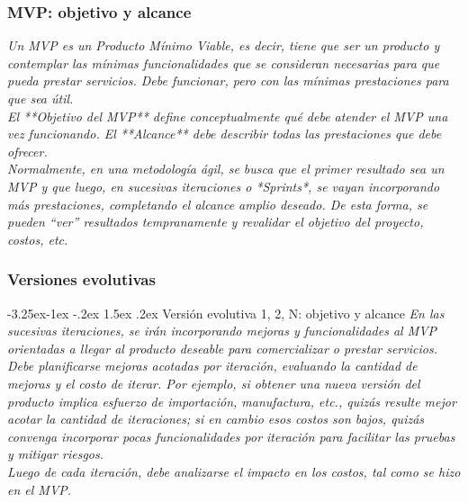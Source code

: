 \documentclass[12pt]{article}
\makeatletter
\renewcommand\paragraph{\@startsection{paragraph}{4}{\z@}%
                                     {-3.25ex\@plus -1ex \@minus -.2ex}%
                                     {1.5ex \@plus .2ex}%
                                     {\normalfont\normalsize\bfseries}}
\makeatother
\begin{document}
\subsubsection{MVP: objetivo y alcance}
{\it
Un MVP es un Producto Mínimo Viable, es decir, tiene que ser un producto y contemplar las mínimas funcionalidades que se consideran necesarias para que pueda prestar servicios. Debe funcionar, pero con las mínimas prestaciones para que sea útil.\\
El **Objetivo del MVP** define conceptualmente qué debe atender el MVP una vez funcionando. El **Alcance** debe describir todas las prestaciones que debe ofrecer.\\
Normalmente, en una metodología ágil, se busca que el primer resultado sea un MVP y que luego, en sucesivas iteraciones o *Sprints*, se vayan incorporando más prestaciones, completando el alcance amplio deseado. De esta forma, se pueden “ver” resultados tempranamente y revalidar el objetivo del proyecto, costos, etc.
}


\subsubsection{Versiones evolutivas}
\paragraph{Versión evolutiva 1, 2, N: objetivo y alcance}
{\it
En las sucesivas iteraciones, se irán incorporando mejoras y funcionalidades al MVP orientadas a llegar al producto deseable para comercializar o prestar servicios.\\
Debe planificarse mejoras acotadas por iteración, evaluando la cantidad de mejoras y el costo de iterar. Por ejemplo, si obtener una nueva versión del producto implica esfuerzo de importación, manufactura, etc., quizás resulte mejor acotar la cantidad de iteraciones; si en cambio esos costos son bajos, quizás convenga incorporar pocas funcionalidades por iteración para facilitar las pruebas y mitigar riesgos.\\
Luego de cada iteración, debe analizarse el impacto en los costos, tal como se hizo en el MVP.
}
\end{document}
